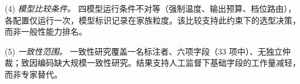 \documentclass[11pt]{article}
\begin{document}
(4) \textit{{\cjkfont 模\allowbreak 型\allowbreak 比\allowbreak 较\allowbreak 条\allowbreak 件\allowbreak 。}} {\cjkfont 四\allowbreak 模\allowbreak 型\allowbreak 运\allowbreak 行\allowbreak 条\allowbreak 件\allowbreak 不\allowbreak 对\allowbreak 等\allowbreak （\allowbreak 强\allowbreak 制\allowbreak 温\allowbreak 度\allowbreak 、\allowbreak 输\allowbreak 出\allowbreak 预\allowbreak 算\allowbreak 、\allowbreak 档\allowbreak 位\allowbreak 路\allowbreak 由\allowbreak ）\allowbreak ，\allowbreak 各\allowbreak 配\allowbreak 置\allowbreak 仅\allowbreak 运\allowbreak 行\allowbreak 一\allowbreak 次\allowbreak ，\allowbreak 模\allowbreak 型\allowbreak 标\allowbreak 识\allowbreak 记\allowbreak 录\allowbreak 在\allowbreak 家\allowbreak 族\allowbreak 粒\allowbreak 度\allowbreak 。\allowbreak 该\allowbreak 比\allowbreak 较\allowbreak 支\allowbreak 持\allowbreak 此\allowbreak 约\allowbreak 束\allowbreak 下\allowbreak 的\allowbreak 选\allowbreak 型\allowbreak 决\allowbreak 策\allowbreak ，\allowbreak 而\allowbreak 非\allowbreak 一\allowbreak 般\allowbreak 性\allowbreak 能\allowbreak 力\allowbreak 排\allowbreak 名\allowbreak 。}

(5) \textit{{\cjkfont 一\allowbreak 致\allowbreak 性\allowbreak 范\allowbreak 围\allowbreak 。}} {\cjkfont 一\allowbreak 致\allowbreak 性\allowbreak 研\allowbreak 究\allowbreak 覆\allowbreak 盖\allowbreak 一\allowbreak 名\allowbreak 标\allowbreak 注\allowbreak 者\allowbreak 、\allowbreak 六\allowbreak 项\allowbreak 字\allowbreak 段\allowbreak （}33 {\cjkfont 项\allowbreak 中\allowbreak ）\allowbreak 、\allowbreak 无\allowbreak 独\allowbreak 立\allowbreak 仲\allowbreak 裁\allowbreak ；\allowbreak 致\allowbreak 因\allowbreak 编\allowbreak 码\allowbreak 缺\allowbreak 大\allowbreak 规\allowbreak 模\allowbreak 一\allowbreak 致\allowbreak 性\allowbreak 研\allowbreak 究\allowbreak 。\allowbreak 结\allowbreak 果\allowbreak 支\allowbreak 持\allowbreak 人\allowbreak 工\allowbreak 监\allowbreak 督\allowbreak 下\allowbreak 基\allowbreak 础\allowbreak 字\allowbreak 段\allowbreak 的\allowbreak 工\allowbreak 作\allowbreak 量\allowbreak 减\allowbreak 轻\allowbreak ，\allowbreak 而\allowbreak 非\allowbreak 专\allowbreak 家\allowbreak 替\allowbreak 代\allowbreak 。}
\end{document}
